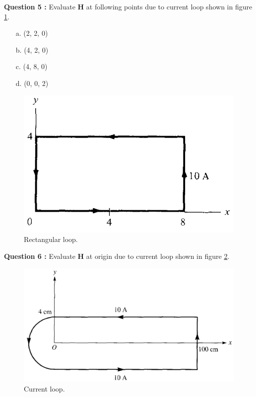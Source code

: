 \documentclass[12pt,a4paper]{article}
\begin{document}
\noindent\textbf{Question 5 \cite[Problem 7.9, page 298]{Sadiku}:} Evaluate \textbf{H} at following points due to current loop shown in figure \ref{rectangular-loop}.
\begin{itemize}
\item[a.] (2, 2, 0)
\item[b.] (4, 2, 0)
\item[c.] (4, 8, 0)
\item[d.] (0, 0, 2)
\end{itemize}
\begin{figure}[H]
\centering
\includegraphics[scale=0.4]{Figure7-30S.png}
\caption{Rectangular loop.}
\label{rectangular-loop}
\end{figure}
\noindent\textbf{Question 6 \cite[Problem 7.9, page 298]{Sadiku}:} Evaluate \textbf{H} at origin due to current loop shown in figure \ref{semi-rectangular-loop}.
\begin{figure}[H]
\centering
\includegraphics[scale=0.4]{Figure7-31S.png}
\caption{Current loop.}
\label{semi-rectangular-loop}
\end{figure}


\end{document}

